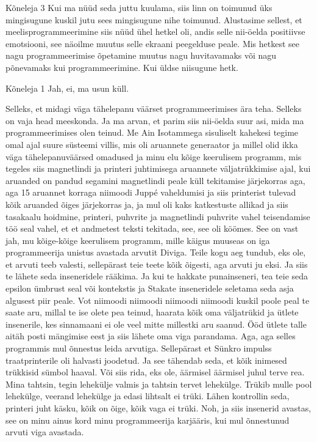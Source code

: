 Kõneleja 3
Kui ma nüüd seda juttu kuulama, siis linn on toimunud üks mingisugune kuskil jutu sees mingisugune nihe toimunud. Alustasime sellest, et meelisprogrammeerimine siis nüüd ühel hetkel oli, andis selle nii-öelda positiivse emotsiooni, see näoilme muutus selle ekraani peegelduse peale. Mis hetkest see nagu programmeerimise õpetamine muutus nagu huvitavamaks või nagu põnevamaks kui programmeerimine. Kui üldse niisugune hetk. 

Kõneleja 1
Jah, ei, ma usun küll. 

Selleks, et midagi väga tähelepanu väärset programmeerimises ära teha. Selleks on vaja head meeskonda. Ja ma arvan, et parim siis nii-öelda suur asi, mida ma programmeerimises olen teinud. Me Ain Isotammega sisuliselt kahekesi tegime omal ajal suure süsteemi villis, mis oli aruannete generaator ja millel olid ikka väga tähelepanuväärsed omadused ja minu elu kõige keerulisem programm, mis tegeles siis magnetlindi ja printeri juhtimisega aruannete väljatrükkimise ajal, kui aruanded on pandud segamini magnetlindi peale küll tekitamise järjekorras aga, aga 15 aruannet korraga niimoodi Juppé vaheldumisi ja siis printerist tulevad kõik aruanded õiges järjekorras ja, ja mul oli kaks katkestuste allikad ja siis tasakaalu hoidmine, printeri, puhvrite ja magnetlindi puhvrite vahel teisendamise töö seal vahel, et et andmetest teksti tekitada, see, see oli köömes. See on vast jah, mu kõige-kõige keerulisem programm, mille käigus muuseas on iga programmeerija unistus avastada arvutit Diviga. Teile kogu aeg tundub, eks ole, et arvuti teeb valesti, sellepärast teie teete kõik õigesti, aga arvuti ju eksi. Ja siis te lähete seda inseneridele rääkima. Ja kui te hakkate punainseneri, tea teie seda epsilon ümbrust seal või kontekstis ja Stakate inseneridele seletama seda asja algusest piir peale. Vot niimoodi niimoodi niimoodi niimoodi kuskil poole peal te saate aru, millal te ise olete pea teinud, haarata kõik oma väljatrükid ja ütlete insenerile, kes sinnamaani ei ole veel mitte millestki aru saanud. Ööd ütlete talle aitäh posti mängimise eest ja siis lähete oma viga parandama. Aga, aga selles programmis mul õnnestus leida arvutiga. Sellepärast et Sünkro impulss traatprinterile oli halvasti joodetud. Ja see tähendab seda, et kõik inimesed trükkisid sümbol haaval. Või siis rida, eks ole, äärmisel äärmisel juhul terve rea. Mina tahtsin, tegin lehekülje valmis ja tahtsin tervet lehekülge. Trükib mulle pool lehekülge, veerand lehekülge ja edasi lihtsalt ei trüki. Lähen kontrollin seda, printeri juht käsku, kõik on õige, kõik vaga ei trüki. Noh, ja siis insenerid avastas, see on minu ainus kord minu programmeerija karjääris, kui mul õnnestunud arvuti viga avastada. 

